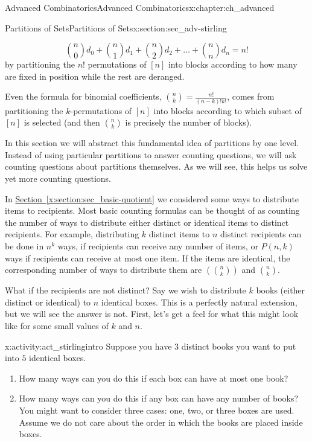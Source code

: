 \documentclass[oneside,10pt,]{book}
\numberwithin{equation}{chapter}
\newcommand{\mchoose}[2]{\left(\!\binom{#1}{#2}\!\right)}
\begin{document}
\begin{chapterptx}{Advanced Combinatorics}{}{Advanced Combinatorics}{}{}{x:chapter:ch_advanced}
\begin{sectionptx}{Partitions of Sets}{}{Partitions of Sets}{}{}{x:section:sec_adv-stirling}
\begin{introduction}{}
\begin{equation*}
\binom{n}{0} d_{0} + \binom{n}{1} d_{1} + \binom{n}{2} d_{2} + \ldots + \binom{n}{n} d_{n} = n!
\end{equation*}
by partitioning the \(n!\) permutations of \([n]\) into blocks according to how many are fixed in position while the rest are deranged.%
\par
Even the formula for binomial coefficients, \(\binom{n}{k} = \frac{n!}{(n-k)!k!}\), comes from partitioning the \(k\)-permutations of \([n]\) into blocks according to which subset of \([n]\) is selected (and then \(\binom{n}{k}\) is precisely the number of blocks).%
\par
In this section we will abstract this fundamental idea of partitions by one level.  Instead of using particular partitions to answer counting questions, we will ask counting questions about partitions themselves.  As we will see, this helps us solve yet more counting questions.%
\par
In \hyperref[x:section:sec_basic-quotient]{Section~\ref{x:section:sec_basic-quotient}} we considered some ways to distribute items to recipients.  Most basic counting formulas can be thought of as counting the number of ways to distribute either distinct or identical items to distinct recipients.  For example, distributing \(k\) distinct items to \(n\) distinct recipients can be done in \(n^k\) ways, if recipients can receive any number of items, or \(P(n,k)\) ways if recipients can receive at most one item.  If the items are identical, the corresponding number of ways to distribute them are \(\mchoose{n}{k}\) and \(\binom{n}{k}\).%
\par
What if the recipients are not distinct?  Say we wish to distribute \(k\) books (either distinct or identical) to \(n\) identical boxes.  This is a perfectly natural extension, but we will see the answer is not.  First, let's get a feel for what this might look like for some small values of \(k\) and \(n\).%
\begin{activity}{}{x:activity:act_stirlingintro}%
Suppose you have \(3\) distinct books you want to put into \(5\) identical boxes.%
\begin{enumerate}[font=\bfseries,label=(\alph*),ref=\alph*]
\item{}How many ways can you do this if each box can have at most one book?%
\item{}How many ways can you do this if any box can have any number of books?  You might want to consider three cases: one, two, or three boxes are used.  Assume we do not care about the order in which the books are placed inside boxes.%

\end{enumerate}
\end{activity}
\end{introduction}
\end{sectionptx}
\end{chapterptx}
\end{document}

